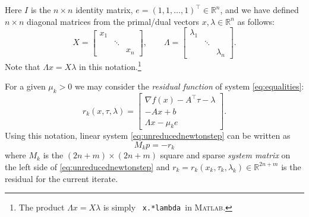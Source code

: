 \documentclass[11pt]{article}
\newcommand{\RR}{\mathbb{R}}
\newcommand{\grad}{\nabla}
\newcommand{\Matlab}{\textsc{Matlab}\xspace}
\begin{document}
Here $I$ is the $n\times n$ identity matrix, $e=(1,1,\dots,1)^\top \in \RR^n$, and we have defined $n\times n$ diagonal matrices from the primal/dual vectors $x,\lambda\in\RR^n$ as follows:
    $$X = \begin{bmatrix} x_1 & & \\ & \ddots & \\ & & x_n \end{bmatrix}, \qquad \Lambda = \begin{bmatrix} \lambda_1 & & \\ & \ddots & \\ & & \lambda_n \end{bmatrix}.$$
Note that $\Lambda x = X \lambda$ in this notation.\footnote{The product $\Lambda x = X\lambda$ is simply \, \texttt{x.*lambda}\, in \Matlab.}

For a given $\mu_k>0$ we may consider the \emph{residual function} of system \eqref{eq:equalities}:
\begin{equation}
r_k(x,\tau,\lambda) = \begin{bmatrix}
\grad f(x) - A^\top \tau - \lambda \\
- A x + b \\
\Lambda x - \mu_k e
\end{bmatrix}. \label{eq:residualnewtonstep}
\end{equation}
Using this notation, linear system \eqref{eq:unreducednewtonstep} can be written as
\begin{equation}
M_k p = - r_k \label{eq:overallnewtonstep}
\end{equation}
where $M_k$ is the $(2n+m) \times (2n+m)$ square and sparse \emph{system matrix} on the left side of \eqref{eq:unreducednewtonstep} and $r_k=r_k(x_k,\tau_k,\lambda_k) \in \RR^{2n+m}$ is the residual for the current iterate.
\end{document}
